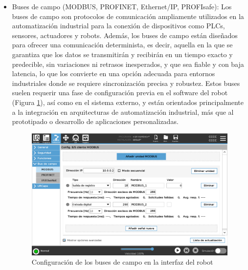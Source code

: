 \begin{itemize}
     \item Buses de campo (MODBUS, PROFINET, Ethernet/IP, PROFIsafe): Los buses de campo son protocolos de comunicación ampliamente utilizados en la automatización industrial para la conexión de dispositivos como PLCs, sensores, actuadores y robots. Además, los buses de campo están diseñados para ofrecer una comunicación determinista, es decir, aquella en la que se garantiza que los datos se transmitirán y recibirán en un tiempo exacto y predecible, sin variaciones ni retrasos inesperados, y que sea fiable y con baja latencia, lo que los convierte en una opción adecuada para entornos industriales donde se requiere sincronización precisa y robustez. Estos buses suelen requerir una fase de configuración previa en el software del robot (Figura \ref{fig:buses_campo}), así como en el sistema externo, y están orientados principalmente a la integración en arquitecturas de automatización industrial, más que al prototipado o desarrollo de aplicaciones personalizadas.
    
      \begin{figure} [H]
        \begin{center}
          \includegraphics[width=13cm]{figs/Buses de campo UR.png}
        \end{center}
        \caption{Configuración de los buses de campo en la interfaz del robot}
        \label{fig:buses_campo}
      \end{figure}  
\end{itemize}

